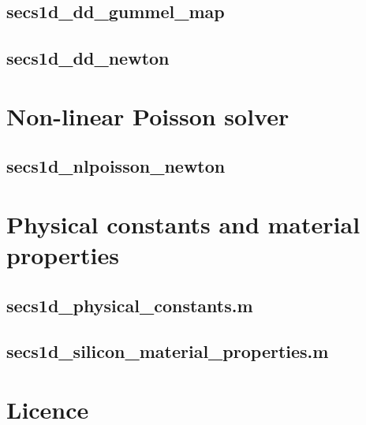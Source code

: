\documentclass[10pt]{article}
\begin{document}
\subsection{secs1d\_dd\_gummel\_map}


\subsection{secs1d\_dd\_newton}


\section{Non-linear Poisson solver}
\subsection{secs1d\_nlpoisson\_newton}


\section{Physical constants and material properties}
\subsection{secs1d\_physical\_constants.m}


\subsection{secs1d\_silicon\_material\_properties.m}


\appendix
\section{Licence}


 
\end{document}
